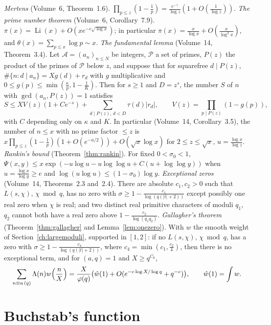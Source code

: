 \begin{reminder}
\emph{Mertens} (Volume~6, Theorem~1.6). $\prod_{p\le z}(1-\frac1p)=\frac{e^{-\gamma}}{\log z}(1+O(\frac1{\log z}))$.
\emph{The prime number theorem} (Volume~6, Corollary~7.9). $\pi(x)=\operatorname{Li}(x)+O(xe^{-c\sqrt{\log x}})$; in particular $\pi(x)=\frac x{\log x}+O(\frac x{\log^2x})$, and $\theta(x)=\sum_{p\le x}\log p\sim x$.
\emph{The fundamental lemma} (Volume~14, Theorem~3.4). Let $\mathcal A=(a_n)_{n\le N}$ be integers, $\mathcal P$ a set of primes, $P(z)$ the product of the primes of $\mathcal P$ below $z$, and suppose that for squarefree $d\mid P(z)$, $\#\{n:d\mid a_n\}=Xg(d)+r_d$ with $g$ multiplicative and $0\le g(p)\le\min(\frac\kappa p,1-\frac1K)$. Then for $s\ge1$ and $D=z^s$, the number $S$ of $n$ with $\gcd(a_n,P(z))=1$ satisfies
\[
S\le XV(z)(1+Ce^{-s})+\sum_{d\mid P(z),\,d<D}\tau(d)|r_d|,\qquad V(z)=\prod_{p\mid P(z)}(1-g(p)),
\]
with $C$ depending only on $\kappa$ and $K$. In particular (Volume~14, Corollary~3.5), the number of $n\le x$ with no prime factor $\le z$ is $x\prod_{p\le z}(1-\frac1p)(1+O(e^{-u/2}))+O(\sqrt x\log x)$ for $2\le z\le\sqrt x$, $u=\frac{\log x}{\log z}$.
\emph{Rankin's bound} (Theorem~\ref{thm:rankin}). For fixed $0<\sigma_0<1$, $\Psi(x,y)\le x\exp(-u\log u-u\log\log u+C(u+\log\log y))$ when $u=\frac{\log x}{\log y}\ge e$ and $\log(u\log u)\le(1-\sigma_0)\log y$.
\emph{Exceptional zeros} (Volume~14, Theorems~2.3 and~2.4). There are absolute $c_1,c_2>0$ such that $L(s,\chi)$, $\chi\bmod q$, has no zero with $\sigma\ge1-\frac{c_1}{\log(q(|t|+2))}$ except possibly one real zero when $\chi$ is real; and two distinct real primitive characters of moduli $q_1$, $q_2$ cannot both have a real zero above $1-\frac{c_2}{\log(q_1q_2)}$.
\emph{Gallagher's theorem} (Theorem~\ref{thm:gallagher} and Lemma~\ref{lem:onezero}). With $w$ the smooth weight of Section~\ref{ch:largemoduli}, supported in $[1,2]$: if no $L(s,\chi)$, $\chi\bmod q$, has a zero with $\sigma\ge1-\frac{c_4}{\log(q(|t|+2))}$, where $c_4=\min(c_1,\frac{c_2}4)$, then there is no exceptional term, and for $(a,q)=1$ and $X\ge q^{C_0}$,
\[
\sum_{n\equiv a\,(q)}\Lambda(n)w\Bigl(\frac nX\Bigr)=\frac X{\varphi(q)}\bigl(\hat w(1)+O(e^{-c\log X/\log q}+q^{-c})\bigr),\qquad\hat w(1)=\int w.
\]
\end{reminder}

\section{Buchstab's function}

